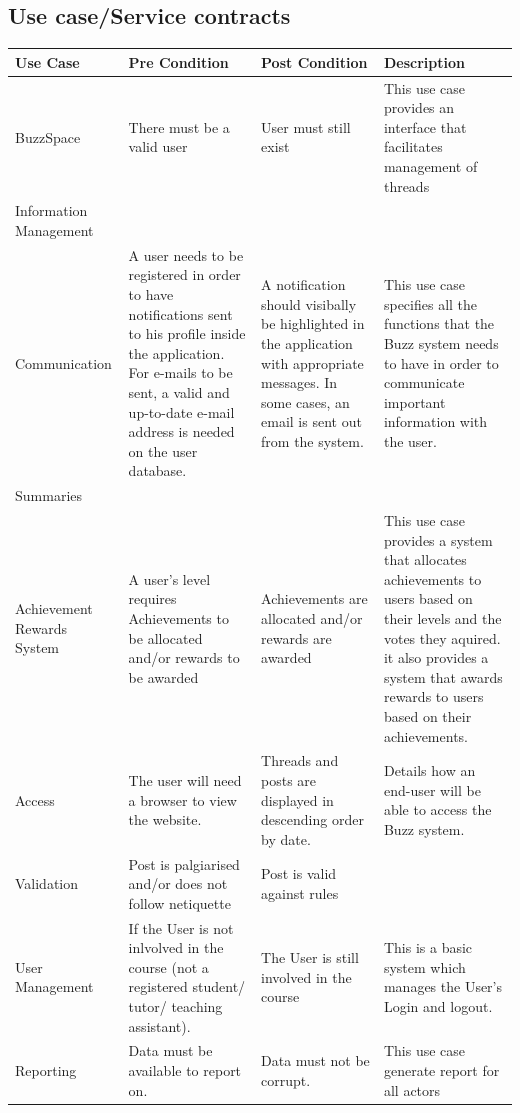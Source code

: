\documentclass[a4paper,12pt]{report}
\begin{document}
\subsection{Use case/Service contracts}
\begin{center}
  \begin{tabular}{| p{3cm} | p{4cm} | p{4cm} | p{4cm} |}
    \hline
    Use Case & Pre Condition & Post Condition & Description \\ \hline \hline
    BuzzSpace & There must be a valid user & User must still exist & This use case provides an interface that facilitates management of threads\\ \hline
    Information Management &  &  &\\ \hline
    Communication& A user needs to be registered in order to have notifications sent to his profile inside the application. For e-mails to be sent, a valid and up-to-date e-mail address is needed on the user database. & A notification should visibally be highlighted in the application with appropriate messages. In some cases, an email is sent out from the system. & This use case specifies all the functions that the Buzz system needs to have in order to communicate important information with the user. \\ \hline
    Summaries &  &  & \\ \hline
    Achievement Rewards System & A user's level requires Achievements to be allocated and/or rewards to be awarded & Achievements are allocated and/or rewards are awarded & This use case provides a system that allocates achievements to users based on their levels and the votes they aquired. it also provides a system that awards rewards to users based on their achievements.\\ \hline
    Access & The user will need a browser to view the website. & Threads and posts are displayed in descending order by date. & Details how an end-user will be able to access the Buzz system. \\ \hline
    Validation & Post is palgiarised and/or does not follow netiquette & Post is valid against rules  & \\ \hline
    User Management & If the User is not inlvolved in the course (not a registered student/ tutor/ teaching assistant).  & The User is still involved in the course & This is a basic system which manages the User's Login and logout. \\ \hline
    Reporting & Data must be available to report on. & Data must not be corrupt. & This use case generate report for all actors\\ \hline
    \hline
  \end{tabular}
\end{center}
\end{document}
